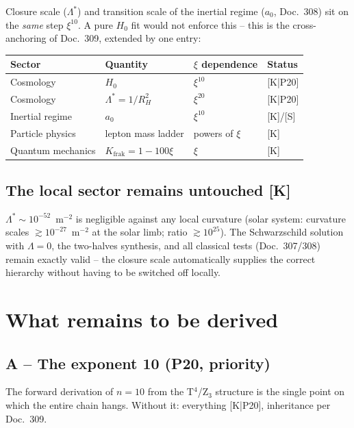 \documentclass[11pt]{report}
\begin{document}
Closure scale ($\Lambda^{*}$) and transition scale of the inertial
regime ($a_0$, Doc.~308) sit on the \emph{same} step $\xi^{10}$. A
pure $H_0$ fit would not enforce this -- this is the cross-anchoring
of Doc.~309, extended by one entry:

\begin{center}
\begin{tabular}{llll}
\toprule
Sector & Quantity & $\xi$ dependence & Status \\
\midrule
Cosmology & $H_0$ & $\xi^{10}$ & [K|P20] \\
Cosmology & $\Lambda^{*} = 1/R_H^2$ & $\xi^{20}$ & [K|P20] \\
Inertial regime & $a_0$ & $\xi^{10}$ & [K]/[S] \\
Particle physics & lepton mass ladder & powers of $\xi$ & [K] \\
Quantum mechanics & $K_\text{frak} = 1-100\xi$ & $\xi$ & [K] \\
\bottomrule
\end{tabular}
\end{center}

\section{The local sector remains untouched [K]}

$\Lambda^{*} \sim 10^{-52}$~m$^{-2}$ is negligible against any local
curvature (solar system: curvature scales
$\gtrsim 10^{-27}$~m$^{-2}$ at the solar limb; ratio
$\gtrsim 10^{25}$). The Schwarzschild solution with $\Lambda = 0$,
the two-halves synthesis, and all classical tests (Doc.~307/308)
remain exactly valid -- the closure scale automatically supplies the
correct hierarchy without having to be switched off locally.

\chapter{What remains to be derived}

\section{A -- The exponent 10 (P20, priority)}

The forward derivation of $n=10$ from the T$^4$/Z$_3$ structure is
the single point on which the entire chain hangs. Without it:
everything [K|P20], inheritance per Doc.~309.
\end{document}
